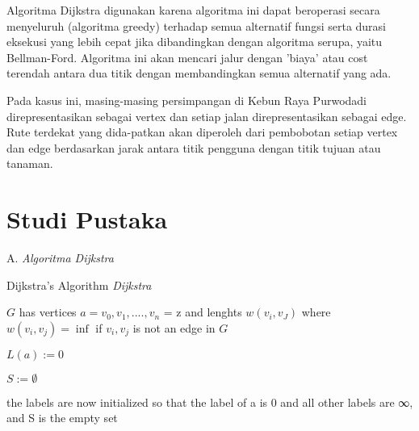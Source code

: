 \documentclass[conference]{IEEEtran}
\begin{document}
Algoritma Dijkstra digunakan karena algoritma ini dapat
beroperasi secara menyeluruh (algoritma greedy) terhadap
semua alternatif fungsi serta durasi eksekusi yang lebih cepat
jika dibandingkan dengan algoritma serupa, yaitu Bellman-Ford. Algoritma ini akan mencari jalur dengan ’biaya’ atau
cost terendah antara dua titik dengan membandingkan semua
alternatif yang ada.

Pada kasus ini, masing-masing persimpangan di Kebun
Raya Purwodadi direpresentasikan sebagai vertex dan setiap
jalan direpresentasikan sebagai edge. Rute terdekat yang dida-patkan akan diperoleh dari pembobotan setiap vertex dan edge
berdasarkan jarak antara titik pengguna dengan titik tujuan
atau tanaman.

\section{Studi Pustaka}
A. \textit{Algoritma Dijkstra}

\begin{algorithm}
    \caption{Dijkstra’s Algorithm \textit{Dijkstra}}
    \SetAlgoLined\DontPrintSemicolon
    {$G$ has vertices $a = v_0, v_1 , .... , v_n$ = z and lenghts 
    $w(v_i , v_J)$ where $w(v_i , v_j) = \inf$ if $v_i , v_j$ is not
    an edge in $G$}

    $L(a) := 0$

    $S :=   ∅$

    {the labels are now initialized so that the label of a is
    0 and all other labels are ∞, and S is the empty set}
    
\end{algorithm}
\end{document}
